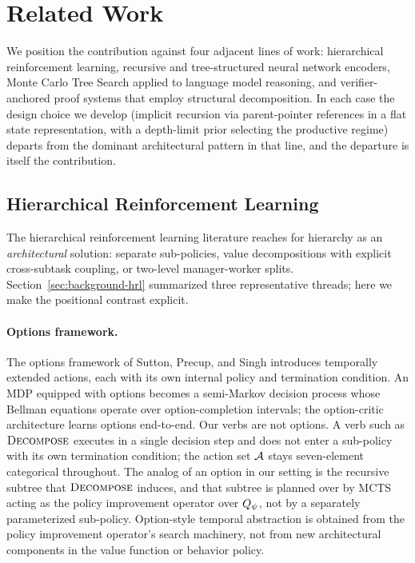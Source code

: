 \section{Related Work}
\label{sec:related-work}


We position the contribution against four adjacent lines of work:
hierarchical reinforcement learning, recursive and tree-structured
neural network encoders, Monte Carlo Tree Search applied to language
model reasoning, and verifier-anchored proof systems that employ
structural decomposition. In each case the design choice we develop
(implicit recursion via parent-pointer references in a flat state
representation, with a depth-limit prior selecting the productive
regime) departs from the dominant architectural pattern in that line,
and the departure is itself the contribution.

\subsection{Hierarchical Reinforcement Learning}
\label{sec:rw-hrl}

The hierarchical reinforcement learning literature reaches for hierarchy
as an \emph{architectural} solution: separate sub-policies, value
decompositions with explicit cross-subtask coupling, or two-level
manager-worker splits. Section~\ref{sec:background-hrl} summarized three
representative threads; here we make the positional contrast explicit.

\paragraph{Options framework.}
The options framework of Sutton, Precup, and Singh
\citep{sutton1999between} introduces temporally extended actions, each
with its own internal policy and termination condition. An MDP equipped
with options becomes a semi-Markov decision process whose Bellman
equations operate over option-completion intervals; the option-critic
architecture \citep{bacon2017option} learns options end-to-end. Our
verbs are not options. A verb such as $\textsc{Decompose}$ executes in a
single decision step and does not enter a sub-policy with its own
termination condition; the action set $\mathcal{A}$ stays seven-element
categorical throughout. The analog of an option in our setting is the
recursive subtree that $\textsc{Decompose}$ induces, and that subtree is
planned over by MCTS acting as the policy improvement operator over
$Q_{\psi}$, not by a separately parameterized sub-policy. Option-style
temporal abstraction is obtained from the policy improvement operator's
search machinery, not from new architectural components in the value
function or behavior policy.

